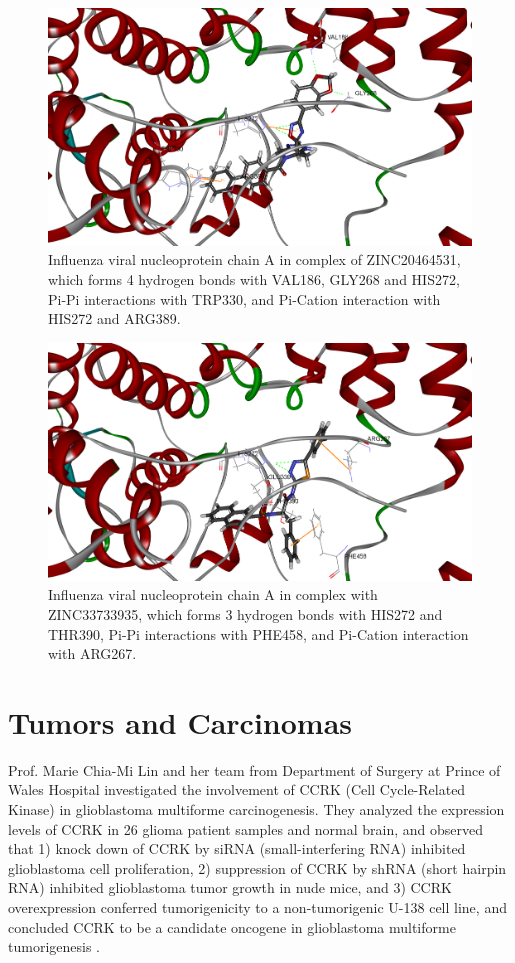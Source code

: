 \begin{figure}
\centering
\includegraphics[width=\linewidth]{Case/2IQH-ZINC20464531.png}
\caption{Influenza viral nucleoprotein chain A in complex of ZINC20464531, which forms 4 hydrogen bonds with VAL186, GLY268 and HIS272, Pi-Pi interactions with TRP330, and Pi-Cation interaction with HIS272 and ARG389.}
\label{Case:2IQH-ZINC20464531}
\end{figure}

\begin{figure}
\centering
\includegraphics[width=\linewidth]{Case/2IQH-ZINC33733935.png}
\caption{Influenza viral nucleoprotein chain A in complex with ZINC33733935, which forms 3 hydrogen bonds with HIS272 and THR390, Pi-Pi interactions with PHE458, and Pi-Cation interaction with ARG267.}
\label{Case:2IQH-ZINC33733935}
\end{figure}

\section{Tumors and Carcinomas}

Prof. Marie Chia-Mi Lin and her team from Department of Surgery at Prince of Wales Hospital investigated the involvement of CCRK (Cell Cycle-Related Kinase) in glioblastoma multiforme carcinogenesis. They analyzed the expression levels of CCRK in 26 glioma patient samples and normal brain, and observed that 1) knock down of CCRK by siRNA (small-interfering RNA) inhibited glioblastoma cell proliferation, 2) suppression of CCRK by shRNA (short hairpin RNA) inhibited glioblastoma tumor growth in nude mice, and 3) CCRK overexpression conferred tumorigenicity to a non-tumorigenic U-138 cell line, and concluded CCRK to be a candidate oncogene in glioblastoma multiforme tumorigenesis \citep{1144}.

